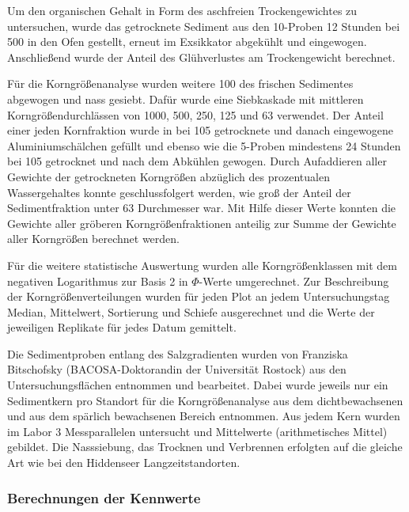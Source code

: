 Um den organischen Gehalt in Form des aschfreien Trockengewichtes zu untersuchen, wurde das getrocknete Sediment aus den \unit{10}{\milli\litre}-Proben 12 Stunden bei \unit{500}{\celsius} in den Ofen gestellt, erneut im Exsikkator abgekühlt und eingewogen. Anschließend wurde der Anteil des Glühverlustes am Trockengewicht berechnet.

Für die Korngrößenanalyse wurden weitere \unit{100}{\gram} des frischen Sedimentes abgewogen und nass gesiebt. Dafür wurde eine Siebkaskade mit mittleren Korngrößendurchlässen von \unit{1000}{\micro\metre}, \unit{500}{\micro\metre}, \unit{250}{\micro\metre}, \unit{125}{\micro\metre} und \unit{63}{\micro\metre} verwendet. Der Anteil einer jeden Kornfraktion wurde in bei \unit{105}{\celsius} getrocknete  und danach eingewogene Aluminiumschälchen gefüllt und ebenso wie die \unit{5}{\milli\litre}-Proben mindestens 24 Stunden bei \unit{105}{\celsius} getrocknet und nach dem Abkühlen gewogen. Durch Aufaddieren aller Gewichte der getrockneten Korngrößen abzüglich des prozentualen Wassergehaltes konnte geschlussfolgert werden, wie groß der Anteil der Sedimentfraktion unter \unit{63}{\micro\metre} Durchmesser war. Mit Hilfe dieser Werte konnten die Gewichte aller gröberen Korngrößenfraktionen anteilig zur Summe der Gewichte aller Korngrößen berechnet werden.

Für die weitere statistische Auswertung wurden alle Korngrößenklassen mit dem negativen Logarithmus zur Basis 2 in $ \Phi $-Werte umgerechnet. 
Zur Beschreibung der Korngrößenverteilungen wurden für jeden Plot an jedem Untersuchungstag Median, Mittelwert, Sortierung und Schiefe ausgerechnet und die Werte der jeweiligen Replikate für jedes Datum gemittelt.

Die Sedimentproben entlang des Salzgradienten wurden von Franziska Bitschofsky (BACOSA-Doktorandin der Universität Rostock) aus den Untersuchungsflächen entnommen und bearbeitet. Dabei wurde jeweils nur ein Sedimentkern pro Standort für die Korngrößenanalyse aus dem dichtbewachsenen und aus dem spärlich bewachsenen Bereich entnommen. Aus jedem Kern wurden im Labor 3 Messparallelen untersucht und Mittelwerte (arithmetisches Mittel) gebildet. Die Nasssiebung, das Trocknen und Verbrennen erfolgten auf die gleiche Art wie bei den Hiddenseer Langzeitstandorten.


 
\subsubsection{Berechnungen der Kennwerte}


